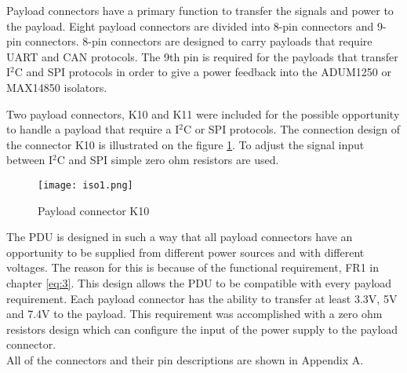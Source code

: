 Payload connectors have a primary function to transfer the signals and power to the payload. Eight payload connectors are divided into 8-pin connectors and 9-pin connectors. 8-pin connectors are designed to carry payloads that require UART and CAN protocols. The 9th pin is required for the payloads that transfer I$^2$C and SPI protocols in order to give a power feedback into the ADUM1250 or MAX14850 isolators.  

Two payload connectors, K10 and K11 were included for the possible opportunity to handle a payload that require a I$^2$C or SPI protocols.
The connection design of the connector K10 is illustrated on the figure \ref{fig: iso1}. To adjust the signal input between I$^2$C and SPI simple zero ohm resistors are used.

\begin{figure}[h]
	\centering
	\texttt{[image: iso1.png]}
	\caption{Payload connector K10}
	\label{fig: iso1}
\end{figure} 
 
The PDU is designed in such a way that all payload connectors have an opportunity to be supplied from different power sources and with different voltages. The reason for this is because of the functional requirement, FR1 in chapter \ref{eq:3}. This design allows the PDU to be compatible with every payload requirement. Each payload connector has the ability to transfer at least 3.3V, 5V and 7.4V to the payload.  This requirement was accomplished with a zero ohm  resistors  design which can configure the input of the power supply to the payload connector.\\

All of the connectors and their pin descriptions are shown in Appendix A. 

 
  
  